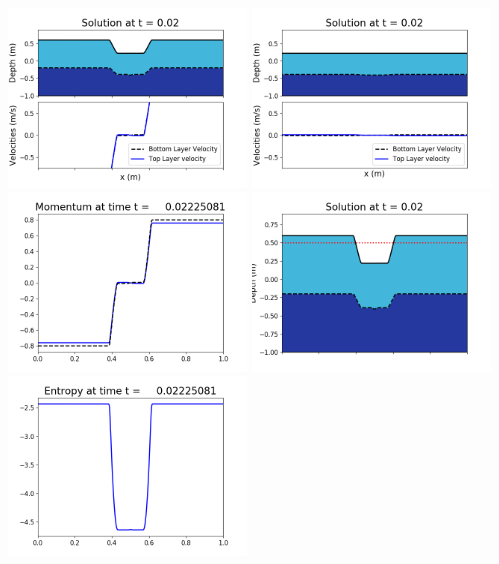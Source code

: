 \documentclass[11pt]{article}
\begin{document}
\vskip 10pt 
\includegraphics[width=0.475\textwidth]{frame0062fig1001.png}
\includegraphics[width=0.475\textwidth]{frame0062fig1002.png}
\vskip 10pt 
\includegraphics[width=0.475\textwidth]{frame0062fig1003.png}
\includegraphics[width=0.475\textwidth]{frame0062fig1006.png}
\vskip 10pt 
\includegraphics[width=0.475\textwidth]{frame0062fig1007.png}
\end{document}
